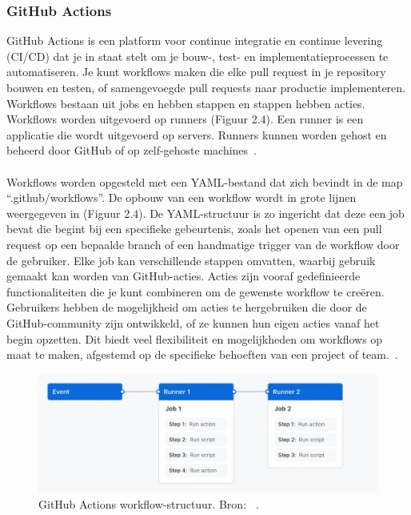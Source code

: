 \newpage

\subsubsection{GitHub Actions}

GitHub Actions is een platform voor continue integratie en continue levering (CI/CD) dat je in staat stelt om je bouw-, test- en implementatieprocessen te automatiseren. Je kunt workflows maken die elke pull request in je repository bouwen en testen, of samengevoegde pull requests naar productie implementeren. Workflows bestaan uit jobs en hebben stappen en stappen hebben acties. Workflows worden uitgevoerd op runners (Figuur 2.4). Een runner is een applicatie die wordt uitgevoerd op servers. Runners kunnen worden gehost en beheerd door GitHub of op zelf-gehoste machines~\autocite{githubActionsIntro}.
\\\\
Workflows worden opgesteld met een YAML-bestand dat zich bevindt in de map “.github/workflows”. De opbouw van een workflow wordt in grote lijnen weergegeven in (Figuur 2.4). De YAML-structuur is zo ingericht dat deze een job bevat die begint bij een specifieke gebeurtenis, zoals het openen van een pull request op een bepaalde branch of een handmatige trigger van de workflow door de gebruiker. Elke job kan verschillende stappen omvatten, waarbij gebruik gemaakt kan worden van GitHub-acties. Acties zijn vooraf gedefinieerde functionaliteiten die je kunt combineren om de gewenste workflow te creëren. Gebruikers hebben de mogelijkheid om acties te hergebruiken die door de GitHub-community zijn ontwikkeld, of ze kunnen hun eigen acties vanaf het begin opzetten. Dit biedt veel flexibiliteit en mogelijkheden om workflows op maat te maken, afgestemd op de specifieke behoeften van een project of team.~\autocite{githubActionsIntro}.

\begin{figure}{\textwidth}
    \centering
    \includegraphics[width=0.8\linewidth]{Foto's/overview-actions-simple.png}
    \caption{GitHub Actions workflow-structuur. Bron: ~\autocite{githubActionsIntro}.}
    \label{fig:workflow-structuur}
\end{figure}

